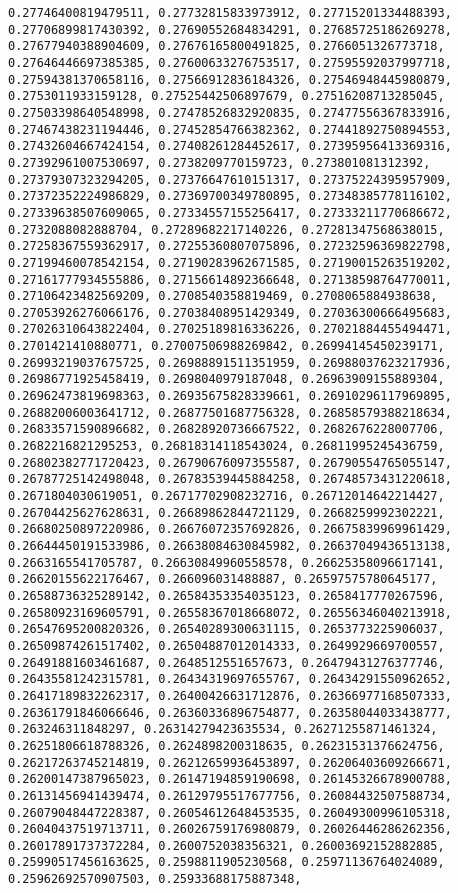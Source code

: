\documentclass[11pt]{article}
\begin{document}
\begin{Verbatim}[commandchars=\\\{\}]
0.27746400819479511, 0.27732815833973912, 0.27715201334488393, 0.27706899817430392, 0.27690552684834291, 0.27685725186269278, 0.27677940388904609, 0.27676165800491825, 0.2766051326773718, 0.27646446697385385, 0.27600633276753517, 0.27595592037997718, 0.27594381370658116, 0.27566912836184326, 0.27546948445980879, 0.2753011933159128, 0.27525442506897679, 0.27516208713285045, 0.27503398640548998, 0.27478526832920835, 0.27477556367833916, 0.27467438231194446, 0.27452854766382362, 0.27441892750894553, 0.27432604667424154, 0.27408261284452617, 0.27395956413369316, 0.27392961007530697, 0.2738209770159723, 0.273801081312392, 0.27379307323294205, 0.27376647610151317, 0.27375224395957909, 0.27372352224986829, 0.27369700349780895, 0.27348385778116102, 0.27339638507609065, 0.27334557155256417, 0.27333211770686672, 0.2732088082888704, 0.27289682217140226, 0.27281347568638015, 0.27258367559362917, 0.27255360807075896, 0.27232596369822798, 0.27199460078542154, 0.27190283962671585, 0.27190015263519202, 0.27161777934555886, 0.27156614892366648, 0.27138598764770011, 0.27106423482569209, 0.2708540358819469, 0.2708065884938638, 0.27053926276066176, 0.27038408951429349, 0.27036300666495683, 0.27026310643822404, 0.27025189816336226, 0.27021884455494471, 0.2701421410880771, 0.27007506988269842, 0.26994145450239171, 0.26993219037675725, 0.26988891511351959, 0.26988037623217936, 0.26986771925458419, 0.2698040979187048, 0.26963909155889304, 0.26962473819698363, 0.26935675828339661, 0.26910296117969895, 0.26882006003641712, 0.26877501687756328, 0.26858579388218634, 0.26833571590896682, 0.26828920736667522, 0.2682676228007706, 0.2682216821295253, 0.26818314118543024, 0.26811995245436759, 0.26802382771720423, 0.26790676097355587, 0.26790554765055147, 0.26787725142498048, 0.26783539445884258, 0.26748573431220618, 0.2671804030619051, 0.26717702908232716, 0.26712014642214427, 0.26704425627628631, 0.26689862844721129, 0.2668259992302221, 0.26680250897220986, 0.26676072357692826, 0.26675839969961429, 0.26644450191533986, 0.26638084630845982, 0.26637049436513138, 0.2663165541705787, 0.26630849960558578, 0.26625358096617141, 0.26620155622176467, 0.266096031488887, 0.26597575780645177, 0.26588736325289142, 0.26584353354035123, 0.2658417770267596, 0.26580923169605791, 0.26558367018668072, 0.26556346040213918, 0.26547695200820326, 0.26540289300631115, 0.2653773225906037, 0.26509874261517402, 0.26504887012014333, 0.2649929669700557, 0.26491881603461687, 0.2648512551657673, 0.26479431276377746, 0.26435581242315781, 0.26434319697655767, 0.26434291550962652, 0.26417189832262317, 0.26400426631712876, 0.26366977168507333, 0.26361791846066646, 0.26360336896754877, 0.26358044033438777, 0.263246311848297, 0.26314279423635534, 0.26271255871461324, 0.26251806618788326, 0.2624898200318635, 0.26231531376624756, 0.26217263745214819, 0.26212659936453897, 0.26206403609266671, 0.26200147387965023, 0.26147194859190698, 0.26145326678900788, 0.26131456941439474, 0.26129795517677756, 0.26084432507588734, 0.26079048447228387, 0.26054612648453535, 0.26049300996105318, 0.26040437519713711, 0.26026759176980879, 0.26026446286262356, 0.26017891737372284, 0.2600752038356321, 0.26003692152882885, 0.25990517456163625, 0.2598811905230568, 0.25971136764024089, 0.25962692570907503, 0.25933688175887348, 
\end{Verbatim}
\end{document}
